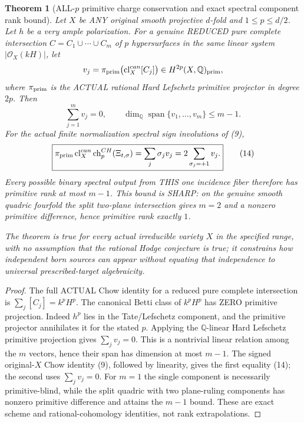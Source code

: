 \documentclass[11pt]{article}
\newtheorem{theorem}{Theorem}
\begin{document}
\begin{theorem}[ALL-$p$ primitive charge conservation and exact spectral component rank bound]
Let $X$ be ANY original smooth projective
$d$-fold and $1\le p\le d/2$.
Let $h$ be a very ample polarization.
For a genuine REDUCED pure complete intersection
$C=C_1\cup\cdots\cup C_m$ of
$p$ hypersurfaces in the same linear
system $|\mathcal O_X(kH)|$,
let
\[
  v_j=\pi_{\rm prim}\bigl(
         \operatorname{cl}^{can}_X[C_j]\bigr)
        \in H^{2p}(X,\mathbb Q)_{\rm prim},
\]
where $\pi_{\rm prim}$ is the ACTUAL rational
Hard Lefschetz primitive projector in degree $2p$.
Then
\[
 \boxed{\sum_{j=1}^m v_j=0,\qquad
 \dim_{\mathbb Q}\operatorname{span}
        \{v_1,\ldots,v_m\}\le m-1.}                  \tag{13}
\]
For the actual finite normalization spectral
sign involutions of (9),
\[
 \boxed{
 \pi_{\rm prim}\operatorname{cl}^{can}_X
       \operatorname{ch}^{CH}_p(\Xi_{t,\sigma})
  =\sum_j\sigma_j v_j
  =2\sum_{\sigma_j=+1}v_j .
 }                                                        \tag{14}
\]
Every possible binary spectral output from
THIS one incidence fiber therefore has primitive
rank at most $m-1$.
This bound is SHARP: on the genuine
smooth quadric fourfold the split
two-plane intersection gives
$m=2$ and a nonzero primitive difference,
hence primitive rank exactly $1$.

The theorem is true for every actual
irreducible variety $X$ in the specified
range, with no assumption that the
rational Hodge conjecture is true;
it constrains how independent born
sources can appear without equating
that independence to universal
prescribed-target algebraicity.
\end{theorem}
\begin{proof}
The full ACTUAL Chow identity for a
reduced pure complete intersection is
$\sum_j[C_j]=k^pH^p$.
The canonical Betti class of $k^pH^p$
has ZERO primitive projection.
Indeed $h^p$ lies in the Tate/Lefschetz
component, and the primitive projector
annihilates it for the stated $p$.
Applying the $\mathbb Q$-linear
Hard Lefschetz primitive projection
gives $\sum_jv_j=0$.
This is a nontrivial linear relation
among the $m$ vectors, hence their
span has dimension at most $m-1$.
The signed original-$X$ Chow
identity (9), followed by linearity,
gives the first equality (14);
the second uses $\sum_jv_j=0$.
For $m=1$ the single component is
necessarily primitive-blind,
while the split quadric with two
plane-ruling components has nonzero
primitive difference and attains
the $m-1$ bound. These are exact
scheme and rational-cohomology
identities, not rank extrapolations.
\end{proof}
\end{document}
